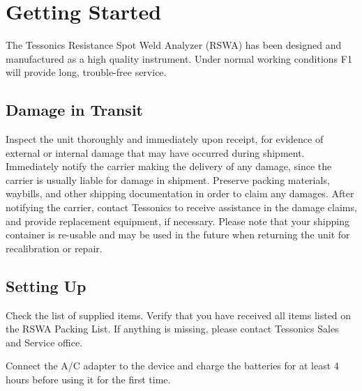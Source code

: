 \chapter[getting-started]{Getting Started}

The Tessonics Resistance Spot Weld Analyzer (RSWA) has been designed and
manufactured as a high quality instrument. Under normal working conditions F1
will provide long, trouble-free service.

\section[damage-in-transit]{Damage in Transit}

Inspect the unit thoroughly and immediately upon receipt, for evidence of
external or internal damage that may have occurred during shipment. Immediately
notify the carrier making the delivery of any damage, since the carrier is
usually liable for damage in shipment. Preserve packing materials, waybills, and
other shipping documentation in order to claim any damages. After notifying the
carrier, contact Tessonics to receive assistance in the damage claims, and
provide replacement equipment, if necessary. Please note that your shipping
container is re-usable and may be used in the future when returning the unit for
recalibration or repair.

\section[setting-up]{Setting Up}

Check the list of supplied items. Verify that you have received all items listed
on the RSWA Packing List. If anything is missing, please contact Tessonics Sales
and Service office.

Connect the A/C adapter to the device and charge the batteries for at least 4
hours before using it for the first time.